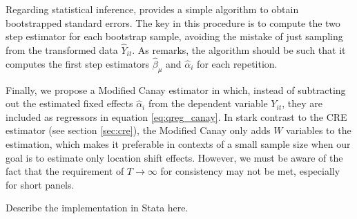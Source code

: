 \documentclass{article}
\begin{document}
Regarding statistical inference, \cite{canay2011} provides a simple algorithm to obtain bootstrapped standard errors. The key in this procedure is to compute the two step estimator for each bootstrap sample, avoiding the mistake of just sampling from the transformed data $\hat{Y}_{it}$. As \cite{canay2011} remarks, the algorithm should be such that it computes the first step estimators $\hat{\beta}_{\mu}$ and $\hat{\alpha}_i$ for each repetition.

Finally, we propose a Modified Canay estimator in which, instead of subtracting out the estimated fixed effects $\hat{\alpha}_i$ from the dependent variable $Y_{it}$, they are included as regressors in equation \ref{eq:qreg_canay}. In stark contrast to the CRE estimator (see section \ref{sec:cre}), the Modified Canay only adds $W$ variables to the estimation, which makes it preferable in contexts of a small sample size when our goal is to estimate only location shift effects. However, we must be aware of the fact that the requirement of $T \rightarrow \infty$ for consistency may not be met, especially for short panels.

Describe the implementation in Stata here.
\end{document}
